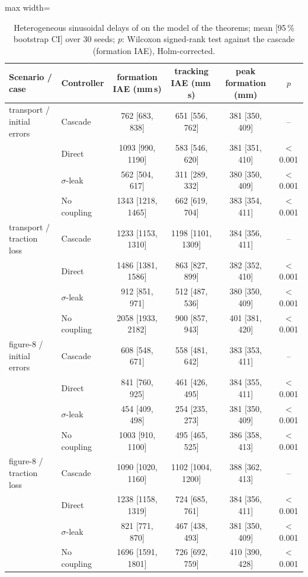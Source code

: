 \begin{table}[htbp]\centering\small
\caption{Heterogeneous sinusoidal delays of \cite{peng2023} on the model of the theorems; mean [95\,\% bootstrap CI] over 30 seeds; $p$: Wilcoxon signed-rank test against the cascade (formation IAE), Holm-corrected.}\label{tab:r1}
\begin{adjustbox}{max width=\linewidth}
\begin{tabular}{@{}llcccc@{}}\toprule
Scenario / case & Controller & formation IAE (mm\,s) & tracking IAE (mm\,s) & peak formation (mm) & $p$\\\midrule
transport / initial errors & Cascade & 762 [683, 838] & 651 [556, 762] & 381 [350, 409] & --\\
 & Direct & 1093 [990, 1190] & 583 [546, 620] & 381 [351, 410] & $<$0.001\\
 & $\sigma$-leak & 562 [504, 617] & 311 [289, 332] & 380 [350, 409] & $<$0.001\\
 & No coupling & 1343 [1218, 1465] & 662 [619, 704] & 383 [354, 411] & $<$0.001\\
\addlinespace
transport / traction loss & Cascade & 1233 [1153, 1310] & 1198 [1101, 1309] & 384 [356, 411] & --\\
 & Direct & 1486 [1381, 1586] & 863 [827, 899] & 382 [352, 410] & $<$0.001\\
 & $\sigma$-leak & 912 [851, 971] & 512 [487, 536] & 380 [350, 409] & $<$0.001\\
 & No coupling & 2058 [1933, 2182] & 900 [857, 943] & 401 [381, 420] & $<$0.001\\
\addlinespace
figure-8 / initial errors & Cascade & 608 [548, 671] & 558 [481, 642] & 383 [353, 411] & --\\
 & Direct & 841 [760, 925] & 461 [426, 495] & 384 [355, 411] & $<$0.001\\
 & $\sigma$-leak & 454 [409, 498] & 254 [235, 273] & 381 [350, 409] & $<$0.001\\
 & No coupling & 1003 [910, 1100] & 495 [465, 525] & 386 [358, 413] & $<$0.001\\
\addlinespace
figure-8 / traction loss & Cascade & 1090 [1020, 1160] & 1102 [1004, 1200] & 388 [362, 413] & --\\
 & Direct & 1238 [1158, 1319] & 724 [685, 761] & 384 [356, 411] & $<$0.001\\
 & $\sigma$-leak & 821 [771, 870] & 467 [438, 493] & 381 [350, 409] & $<$0.001\\
 & No coupling & 1696 [1591, 1801] & 726 [692, 759] & 410 [390, 428] & $<$0.001\\
\bottomrule\end{tabular}
\end{adjustbox}
\end{table}
